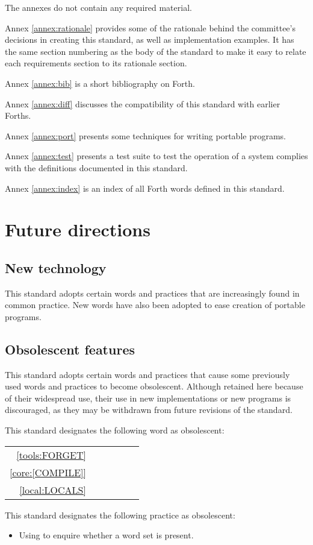 The annexes do not contain any required material.

Annex \ref{annex:rationale} provides some of the rationale behind the
committee's decisions in creating this standard, as well as
implementation examples. It has the same section numbering as the
body of the standard to make it easy to relate each requirements
section to its rationale section.

Annex \ref{annex:bib} is a short bibliography on Forth.


Annex \ref{annex:diff} discusses the compatibility of this standard
with earlier Forths.

Annex \ref{annex:port} presents some techniques for writing portable
programs.

\ifrelease\else
Annex \ref{annex:test} presents a test suite to test the operation
of a system complies with the definitions documented in this
standard.
\fi

Annex \ref{annex:index} is an index of all Forth words defined in this
standard.

\section{Future directions}

\subsection{New technology}

This standard adopts certain words and practices that are
increasingly found in common practice. New words have also
been adopted to ease creation of portable programs.

\subsection{Obsolescent features}
\label{intro:obsoleat}

This standard adopts certain words and practices that cause
some previously used words and practices to become obsolescent.
Although retained here because of their widespread use, their
use in new implementations or new programs is discouraged,
as they may be withdrawn from future revisions of the standard.

This standard designates the following word as obsolescent:

\begin{tabular}{rl@{\qquad}rl@{\qquad}rl}
	\ref{tools:FORGET}	& \word[tools]{FORGET}	\\
	\ref{core:[COMPILE]}& \word{[COMPILE]} \\
	\ref{local:LOCALS}	& \word[local]{LOCALS}
\end{tabular}

This standard designates the following practice as obsolescent:

\begin{itemize}
\item Using  to enquire whether a word set is present.
\end{itemize}
